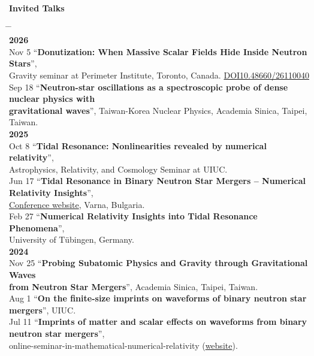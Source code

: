 \documentclass[10pt,floatfix,a4paper]{article}
\newcommand{\hk}[1]{\textcolor{UIUCOrange}{#1}}
\begin{document}
{\large \bf \hk{Invited Talks}}
\begin{tabbing}
  \hspace*{5mm} \= \hspace*{2cm} \= \hspace*{10cm} \\[-3ex]
  \> \textbf{2026} \> \\[1ex]
  \> Nov 5 \> ``\textbf{Donutization: When Massive Scalar Fields Hide Inside Neutron Stars}'', \\
  \> \> Gravity seminar at Perimeter Institute, Toronto, Canada. \href{https://pirsa.org/26110040}{DOI10.48660/26110040} \\
  \> Sep 18 \> ``\textbf{Neutron-star oscillations as a spectroscopic probe of dense nuclear physics with} \\
  \> \> \textbf{gravitational waves}'', Taiwan-Korea Nuclear Physics, Academia Sinica, Taipei, Taiwan. \\
  \> \textbf{2025} \> \\[1ex]
  \> Oct 8 \> ``\textbf{Tidal Resonance: Nonlinearities revealed by numerical relativity}'', \\
  \> \> Astrophysics, Relativity, and Cosmology Seminar at UIUC. \\
  \> Jun 17 \> ``\textbf{Tidal Resonance in Binary Neutron Star Mergers -- Numerical Relativity Insights}'', \\
  \> \> \href{https://indico.global/event/13880/}{Conference website}, Varna, Bulgaria.\\
  \> Feb 27 \> ``\textbf{Numerical Relativity Insights into Tidal Resonance Phenomena}'', \\
  \> \> University of T{\"u}bingen, Germany.\\
  \> \textbf{2024} \> \\[1ex]
  \> Nov 25 \> ``\textbf{Probing Subatomic Physics and Gravity through Gravitational Waves}\\
  \> \> \textbf{from Neutron Star Mergers}'', Academia Sinica, Taipei, Taiwan. \\
  \> Aug 1 \> ``\textbf{On the finite-size imprints on waveforms of binary neutron star mergers}'', UIUC. \\  
  \> Jul 11 \> ``\textbf{Imprints of matter and scalar effects on waveforms from binary neutron star mergers}'',\\
  \> \> online-seminar-in-mathematical-numerical-relativity (\href{https://github.com/Mathematical-Numerical-Relativity/Online-Seminar/wiki}{website}). \\

\end{tabbing}
\end{document}
